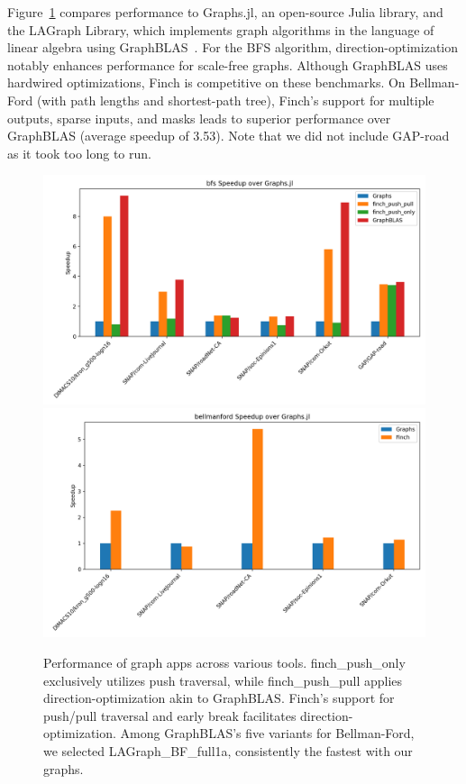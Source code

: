 Figure~\ref{fig:graph_result} compares performance to Graphs.jl, an open-source Julia library, and the LAGraph Library, which implements graph algorithms in the language of linear algebra using GraphBLAS~\cite{mattson2019lagraph}. For the BFS algorithm, direction-optimization notably enhances performance for scale-free graphs. Although GraphBLAS uses hardwired optimizations, Finch is competitive on these benchmarks. On Bellman-Ford (with path lengths and shortest-path tree), Finch's support for multiple outputs, sparse inputs, and masks leads to superior performance over GraphBLAS (average speedup of 3.53). Note that we did not include GAP-road as it took too long to run. %
 
\begin{figure}
	\includegraphics[width=0.5\linewidth]{bfs_speedup_over_graphs.jl.png}%
	\includegraphics[width=0.5\linewidth]{bellmanford_speedup_over_graphs.jl.png}
    \vspace{-12pt}
    \caption{Performance of graph apps across various tools. finch\_push\_only exclusively utilizes push traversal, while finch\_push\_pull applies direction-optimization akin to GraphBLAS. Finch's support for push/pull traversal and early break facilitates direction-optimization. Among GraphBLAS's five variants for Bellman-Ford, we selected LAGraph\_BF\_full1a, consistently the fastest with our graphs.}
     \label{fig:graph_result}
\end{figure}

